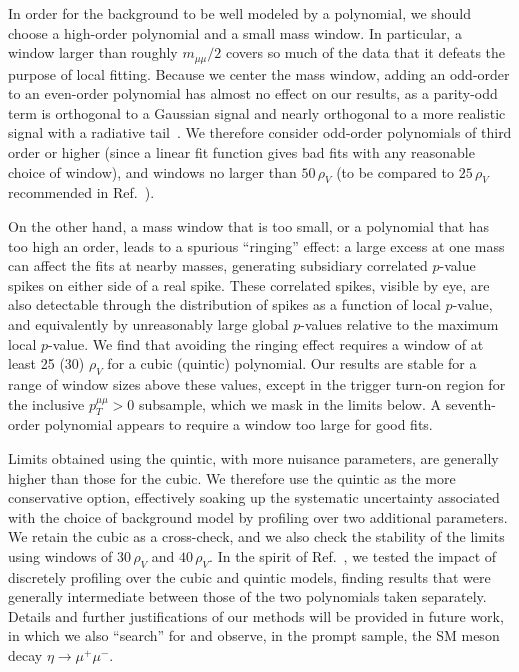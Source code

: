 \documentclass[aps,prd,twocolumn,superscriptaddress,preprintnumbers,nofootinbib,longbibliography,floatfix]{revtex4-1}
\newcommand{\ptmm}{p_T^{\mu\mu}}
\DeclareRobustCommand{\Ref}[1]{Ref.~\cite{#1}}
\begin{document}
In order for the background to be well modeled by a polynomial, we should choose a high-order polynomial and a small mass window.
%
In particular, a window larger than roughly $m_{\mu\mu}/2$ covers so much of the data that it defeats the purpose of local fitting.
%
Because we center the mass window, adding an odd-order to an even-order polynomial has almost no effect on our results, as a parity-odd term is orthogonal to a Gaussian signal and nearly orthogonal to a more realistic signal with a radiative tail~\cite{Williams:2017gwf}.
%
We therefore consider odd-order polynomials of third order or higher (since a linear fit function gives bad fits with any reasonable choice of window), and windows no larger than $50 \, \rho_V$ (to be compared to $25 \,\rho_V$ recommended in \Ref{Williams:2017gwf}).


On the other hand, a mass window that is too small, or a polynomial that has too high an order, leads to a spurious ``ringing'' effect: a large excess at one mass can affect the fits at nearby masses, generating subsidiary correlated $p$-value spikes on either side of a real spike.
%
These correlated spikes, visible by eye, are also detectable through the distribution of spikes as a function of local $p$-value, and equivalently by unreasonably large global $p$-values relative to the maximum local $p$-value.
%
We find that avoiding the ringing effect requires a window of at least 25 (30)  $\rho_V$ for a cubic (quintic) polynomial.
%
Our results are stable for a range of window sizes above these values, except in the trigger turn-on region for the inclusive $\ptmm>0$ subsample, which we mask in the limits below.
%
A seventh-order polynomial appears to require a window too large for good fits.


Limits obtained using the quintic, with more nuisance parameters, are generally higher than those for the cubic.
%
We therefore use the quintic as the more conservative option, effectively soaking up the systematic uncertainty associated with the choice of background model by profiling over two additional parameters.
%
We retain the cubic as a cross-check, and we also check the stability of the limits using windows of $30\, \rho_V$ and $40\, \rho_V$.
%
In the spirit of \Ref{Williams:2017gwf}, we tested the impact of discretely profiling over the cubic and quintic models, finding results that were generally intermediate between those of the two polynomials taken separately.
%
Details and further justifications of our methods will be provided in future work, in which we also ``search'' for and observe, in the prompt sample, the SM meson decay $\eta\to\mu^+\mu^-$.
\end{document}

